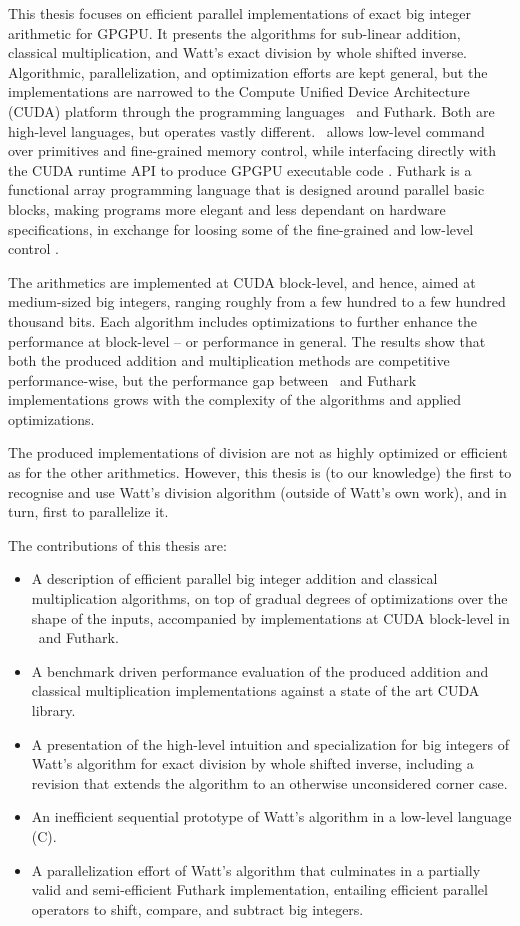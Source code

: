 This thesis focuses on efficient parallel implementations of exact big integer
arithmetic for GPGPU. It presents the algorithms for sub-linear addition,
classical multiplication, and Watt's exact division by whole shifted
inverse. Algorithmic, parallelization, and optimization efforts are kept
general, but the implementations are narrowed to the Compute Unified Device
Architecture (CUDA) platform through the programming languages \cpp\ and
Futhark. Both are high-level languages, but operates vastly different. \cpp\
allows low-level command over primitives and fine-grained memory control, while
interfacing directly with the CUDA runtime API to produce GPGPU executable code
\cite{cudaguide, stroustrup}. Futhark is a functional array programming language
that is designed around parallel basic blocks, making programs more elegant and
less dependant on hardware specifications, in exchange for loosing some of the
fine-grained and low-level control \cite{ParallelProgrammingInFuthark,
  Henriksen:2017:FPF:3062341.3062354}.

The arithmetics are implemented at CUDA block-level, and hence, aimed at
medium-sized big integers, ranging roughly from a few hundred to a few hundred
thousand bits. Each algorithm includes optimizations to further enhance the
performance at block-level -- or performance in general. The results show that
both the produced addition and multiplication methods are competitive
performance-wise, but the performance gap between \cpp\ and Futhark
implementations grows with the complexity of the algorithms and applied
optimizations.

The produced implementations of division are not as highly optimized or
efficient as for the other arithmetics. However, this thesis is (to our
knowledge) the first to recognise and use Watt's division algorithm (outside of
Watt's own work), and in turn, first to parallelize it.

The contributions of this thesis are:
\begin{itemize}
\item A description of efficient parallel big integer addition and classical
  multiplication algorithms, on top of gradual degrees of optimizations over the
  shape of the inputs, accompanied by implementations at CUDA block-level in
  \cpp\ and Futhark.
\item A benchmark driven performance evaluation of the produced addition and
  classical multiplication implementations against a state of the art CUDA
  library.
\item A presentation of the high-level intuition and specialization for big
  integers of Watt's algorithm for exact division by whole shifted inverse,
  including a revision that extends the algorithm to an otherwise unconsidered
  corner case.
\item An inefficient sequential prototype of Watt's algorithm in a low-level
  language (C).
\item A parallelization effort of Watt's algorithm that culminates in a
  partially valid and semi-efficient Futhark implementation, entailing efficient
  parallel operators to shift, compare, and subtract big integers.
\end{itemize}
\bigskip

